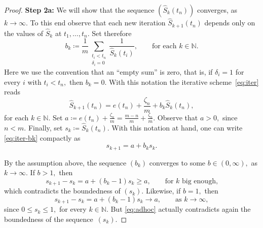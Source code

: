 \documentclass[10pt,a4paper]{amsart}
\def\as{\coloneqq}
\renewcommand{\hat}{\widehat}
\def\l{\left}
\def\nat{\mathbb{N}}
\def\r{\right}
\newcommand{\rec}[1]{\frac{1}{#1}}
\begin{document}
\begin{proof}
\textbf{Step 2a:} We will show that the sequence $\l(\hat{S}_k\l(t_n\r)\r)$ converges, as $k\to\infty.$ To this end observe that each new iteration $\hat{S}_{k+1}\l(t_n\r)$ depends only on the values of $\hat{S}_k$ at $t_1,\dots, t_n.$ Set therefore
\begin{equation} \label{eq:bk-notation}
b_k\as \rec{m} \sum_{\substack{t_i< t_n \\ \delta_i=0}}\rec{\hat{S}_k\l(t_i\r)},\qquad\text{for each } k\in\nat.                                                                                                                                                                                                                                                                                                                                                                                                                                                                \end{equation}
Here we use the convention that an ``empty sum'' is zero, that is, if $\delta_i=1$ for every $i$ with $t_i< t_n,$ then $b_k=0.$ With this notation the iterative scheme~\eqref{eq:iter} reads
\begin{equation} \label{eq:iter-bk}
 \hat{S}_{k+1} \l(t_n\r) = e\l(t_n\r) +\frac{\zeta_n}{m} + b_k \hat{S}_k \l(t_n\r), 
\end{equation}
for each $k\in\nat.$ Set $a\as e\l(t_n\r)+\frac{\zeta_n}{m}=\frac{m-n}{m}+\frac{\zeta_n}{m}.$ Observe that $a>0,$ since $n<m.$ Finally, set $s_k \as \hat{S}_k\l(t_n\r).$ With this notation at hand, one can write \eqref{eq:iter-bk} compactly as
\begin{equation*}
 s_{k+1}= a + b_k s_k.
\end{equation*}

By the assumption above, the sequence $\l(b_k\r)$ converges to some $b\in(0,\infty),$ as $k\to\infty.$ If $b>1,$ then
\begin{equation*}
 s_{k+1}-s_k=a+ \l(b_k-1\r)s_k \ge a,\qquad \text{for } k \text{ big enough,}
\end{equation*}
which contradicts the boundedness of $\l(s_k\r).$ Likewise, if $b=1,$ then
\begin{equation} \label{eq:adhoc}
 s_{k+1}-s_k=a+ \l(b_k-1\r)s_k \to a,\qquad \text{as } k\to\infty,
\end{equation}
since $0\le s_k\le 1,$ for every $k\in\nat.$ But \eqref{eq:adhoc} actually contradicts again the boundedness of the sequence~$\l(s_k\r).$ 


\end{proof}
\end{document}
